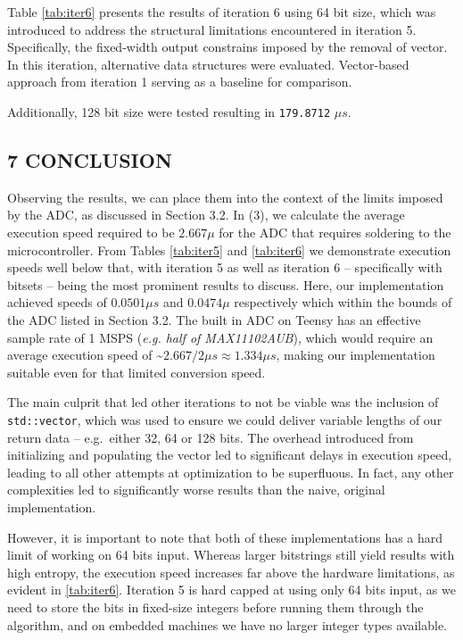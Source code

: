 Table \ref{tab:iter6} presents the results of iteration 6 using 64 bit size, which was introduced to address the structural limitations encountered in iteration 5. Specifically, the fixed-width output constrains imposed by the removal of vector. In this iteration, alternative data structures were evaluated. Vector-based approach from iteration 1 serving as a baseline for comparison.

Additionally, 128 bit size were tested resulting in \texttt{179.8712} \(\mu s\).

\hypertarget{conclusion}{%
\subsection{7 CONCLUSION}\label{conclusion}}

Observing the results, we can place them into the context of the limits imposed by the ADC, as discussed in Section 3.2. In (3), we calculate the average execution speed required to be \(2.667 \mu\) for the ADC that requires soldering to the microcontroller. From Tables \ref{tab:iter5} and \ref{tab:iter6} we demonstrate execution speeds well below that, with iteration 5 as well as iteration 6 -- specifically with bitsets -- being the most prominent results to discuss. Here, our implementation achieved speeds of \(0.0501 \mu s\) and \(0.0474 \mu\) respectively which within the bounds of the ADC listed in Section 3.2. The built in ADC on Teensy has an effective sample rate of 1 MSPS (\emph{e.g. half of MAX11102AUB}), which would require an average execution speed of \textasciitilde{}\(2.667/2 \mu s \approx 1.334 \mu s\), making our implementation suitable even for that limited conversion speed.

The main culprit that led other iterations to not be viable was the inclusion of \texttt{std::vector}, which was used to ensure we could deliver variable lengths of our return data -- e.g.~either 32, 64 or 128 bits. The overhead introduced from initializing and populating the vector led to significant delays in execution speed, leading to all other attempts at optimization to be superfluous. In fact, any other complexities led to significantly worse results than the naive, original implementation.

However, it is important to note that both of these implementations has a hard limit of working on 64 bits input. Whereas larger bitstrings still yield results with high entropy, the execution speed increases far above the hardware limitations, as evident in \ref{tab:iter6}. Iteration 5 is hard capped at using only 64 bits input, as we need to store the bits in fixed-size integers before running them through the algorithm, and on embedded machines we have no larger integer types available.

